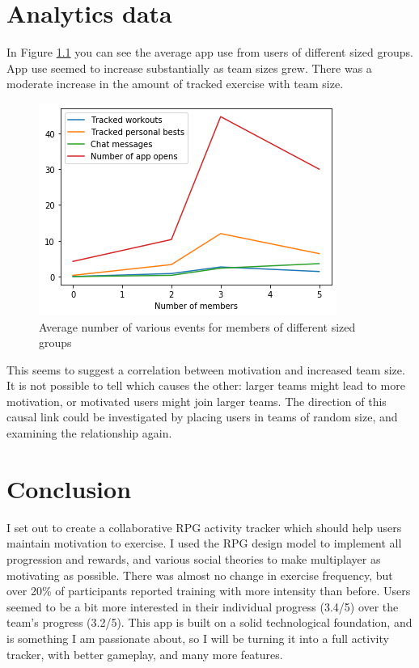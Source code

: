 \documentclass{l4proj}
\begin{document}
\chapter{Analytics data}

In Figure \ref{fig:exercises} you can see the average app use from users of different sized groups. App use seemed to increase substantially as team sizes grew. There was a moderate increase in the amount of tracked exercise with team size.
\begin{figure}[H]
    \centering
    \includegraphics[width=1.0\linewidth]{data/activity.png}    
    \caption{Average number of various events for members of different sized groups}
    \label{fig:exercises} 
\end{figure}
This seems to suggest a correlation between motivation and increased team size. It is not possible to tell which causes the other: larger teams might lead to more motivation, or motivated users might join larger teams. The direction of this causal link could be investigated by placing users in teams of random size, and examining the relationship again.



\chapter{Conclusion}    
I set out to create a collaborative RPG activity tracker which should help users maintain motivation to exercise. I used the RPG design model to implement all progression and rewards, and various social theories to make multiplayer as motivating as possible. There was almost no change in exercise frequency, but over 20\% of participants reported training with more intensity than before. Users seemed to be a bit more interested in their individual progress (3.4/5) over the team's progress (3.2/5). This app is built on a solid technological foundation, and is something I am passionate about, so I will be turning it into a full activity tracker, with better gameplay, and many more features.
\end{document}
